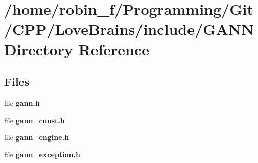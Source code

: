 \section{/home/robin\+\_\+f/\+Programming/\+Git/\+C\+P\+P/\+Love\+Brains/include/\+G\+A\+N\+N Directory Reference}
\label{dir_654318c8c0ebe434bef978a7423064d2}
\subsection*{Files}
\begin{DoxyCompactItemize}
\item 
file {\bfseries gann.\+h}
\item 
file {\bfseries gann\+\_\+const.\+h}
\item 
file {\bfseries gann\+\_\+engine.\+h}
\item 
file {\bfseries gann\+\_\+exception.\+h}
\end{DoxyCompactItemize}
